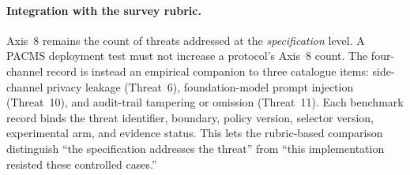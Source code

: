 \paragraph{Integration with the survey rubric.}
Axis~8 remains the count of threats addressed at the
\emph{specification} level. A PACMS deployment test must not
increase a protocol's Axis~8 count. The four-channel record
is instead an empirical companion to three catalogue items:
side-channel privacy leakage (Threat~6), foundation-model
prompt injection (Threat~10), and audit-trail tampering or
omission (Threat~11). Each benchmark record binds the threat
identifier, boundary, policy version, selector version,
experimental arm, and evidence status. This lets the
rubric-based comparison distinguish ``the specification
addresses the threat'' from ``this implementation resisted
these controlled cases.''

